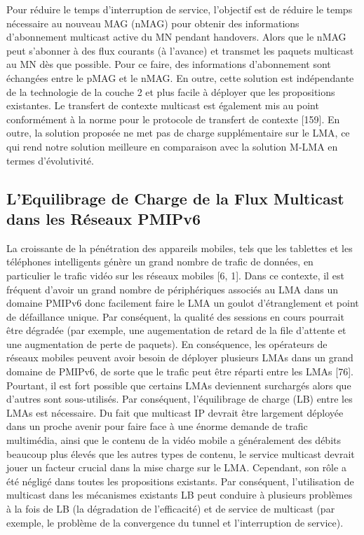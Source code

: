 Pour réduire le temps d'interruption de service, l'objectif est de réduire le temps nécessaire au nouveau MAG (nMAG) pour obtenir des informations d'abonnement multicast active du MN pendant handovers. Alors que le nMAG peut s'abonner à des flux courants (à l'avance) et transmet les paquets multicast au MN dès que possible. Pour ce faire, des informations  d'abonnement sont échangées entre le pMAG et le nMAG. En outre, cette solution est indépendante de la technologie de la couche 2 et plus facile à déployer que les propositions existantes. Le transfert de contexte multicast est également mis au point conformément à la norme pour le protocole de transfert de contexte [159]. En outre, la solution proposée ne met pas de charge supplémentaire sur le LMA, ce qui rend notre solution meilleure en comparaison avec la solution M-LMA en termes d'évolutivité.

\subsection{L'Equilibrage de Charge de la Flux Multicast dans les Réseaux PMIPv6 }
La croissante de la pénétration des appareils mobiles, tels que les tablettes et les téléphones intelligents génère un grand nombre de trafic de données, en particulier le trafic vidéo sur les réseaux mobiles [6, 1]. Dans ce contexte, il est fréquent d'avoir un grand nombre de périphériques associés au LMA dans un domaine PMIPv6 donc facilement faire le LMA un goulot d'étranglement et  point de défaillance unique. Par conséquent, la qualité des sessions en cours pourrait être dégradée (par exemple, une augementation de retard de la file d'attente et une augmentation de perte de paquets). En conséquence, les opérateurs de réseaux mobiles peuvent avoir besoin de déployer plusieurs LMAs dans un grand domaine de PMIPv6, de sorte que le trafic peut être réparti entre les LMAs [76]. Pourtant, il est fort possible que certains LMAs deviennent surchargés alors que d'autres sont sous-utilisés. Par conséquent, l'équilibrage de charge (LB) entre les LMAs est nécessaire. Du fait que multicast IP devrait être largement déployée dans un proche avenir pour faire face à une énorme demande de trafic multimédia, ainsi que le contenu de la vidéo mobile a généralement des débits beaucoup plus élevés que les autres types de contenu, le service multicast devrait jouer un facteur crucial dans la mise charge sur le LMA. Cependant, son rôle a été négligé dans toutes les propositions existants. Par conséquent, l'utilisation de multicast dans les mécanismes existants LB peut conduire à plusieurs problèmes à la fois de LB (la dégradation de l'efficacité) et de service de multicast (par exemple, le problème de la convergence du tunnel et  l'interruption de service).


